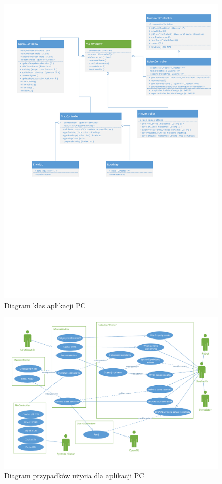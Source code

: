 \documentclass[a4paper]{article}
\begin{document}
\begin{figure}
\centering
\includegraphics[height=0.9\paperheight, angle=90]{diagram_klas.pdf}
\caption{Diagram klas aplikacji PC}
\label{diagram_klas}
\end{figure}

\begin{figure}
\centering
\includegraphics[height=0.55\paperheight, angle=90]{przypadki_uzycia.pdf}
\caption{Diagram przypadków użycia dla aplikacji PC}
\label{diagram_przypadkow_uzycia}
\end{figure}
\end{document}
